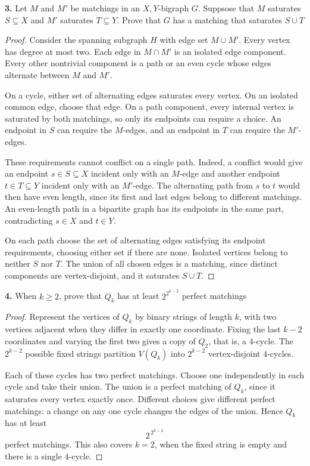 \documentclass[12pt]{amsart}
\theoremstyle{conjecture}
\theoremstyle{definition}
\theoremstyle{question}
\theoremstyle{theorem}
\begin{document}
    \noindent\textbf{3.} Let $M$ and $M'$ be matchings in an $X,Y$-bigraph $G$.
    Suppsose that $M$ saturates $S\subseteq X$ and $M'$ saturates $T\subseteq Y$.
    Prove that $G$ has a matching that saturates $S \cup T$

    \begin{proof}
        Consider the spanning subgraph $H$ with edge set $M\cup M'$.
        Every vertex has degree at most two. Each edge in $M\cap M'$
        is an isolated edge component. Every other nontrivial
        component is a path or an even cycle whose edges alternate
        between $M$ and $M'$.

        On a cycle, either set of alternating edges saturates every
        vertex. On an isolated common edge, choose that edge. On a
        path component, every internal vertex is saturated by both
        matchings, so only its endpoints can require a choice.
        An endpoint in $S$ can require the $M$-edges, and an endpoint
        in $T$ can require the $M'$-edges.

        These requirements cannot conflict on a single path.
        Indeed, a conflict would give an endpoint $s\in S\subseteq X$
        incident only with an $M$-edge and another endpoint
        $t\in T\subseteq Y$ incident only with an $M'$-edge.
        The alternating path from $s$ to $t$ would then have even
        length, since its first and last edges belong to different
        matchings. An even-length path in a bipartite graph has its
        endpoints in the same part, contradicting $s\in X$ and
        $t\in Y$.

        On each path choose the set of alternating edges satisfying
        its endpoint requirements, choosing either set if there are
        none. Isolated vertices belong to neither $S$ nor $T$.
        The union of all chosen edges is a matching, since distinct
        components are vertex-disjoint, and it saturates $S\cup T$.
    \end{proof}

    \noindent\textbf{4.} When $k\ge 2$, prove that $Q_k$ has at least $2^{2^{k-2}}$ perfect matchings

    \begin{proof}
        Represent the vertices of $Q_k$ by binary strings of length
        $k$, with two vertices adjacent when they differ in exactly
        one coordinate. Fixing the last $k-2$ coordinates and varying
        the first two gives a copy of $Q_2$, that is, a $4$-cycle.
        The $2^{k-2}$ possible fixed strings partition $V(Q_k)$ into
        $2^{k-2}$ vertex-disjoint $4$-cycles.

        Each of these cycles has two perfect matchings. Choose one
        independently in each cycle and take their union. The union
        is a perfect matching of $Q_k$, since it saturates every
        vertex exactly once. Different choices give different
        perfect matchings: a change on any one cycle changes the
        edges of the union. Hence $Q_k$ has at least
        \[
            2^{\,2^{k-2}}
        \]
        perfect matchings. This also covers $k=2$, when the fixed
        string is empty and there is a single $4$-cycle.
    \end{proof}
\end{document}
